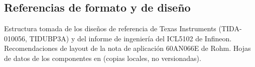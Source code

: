 \subsection{Referencias de formato y de diseño}

Estructura tomada de los diseños de referencia de Texas Instruments (TIDA-010056, TIDUBP3A) y del informe
de ingeniería del ICL5102 de Infineon. Recomendaciones de layout de la nota de aplicación 60AN066E de Rohm.
Hojas de datos de los componentes en  (copias locales, no versionadas).
